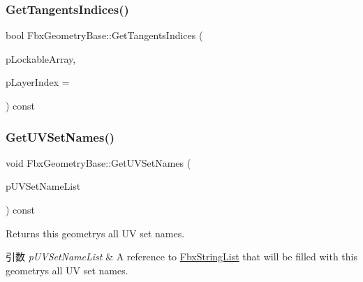 \mbox{\label{class_fbx_geometry_base_aa1da929bb1905386e98d8e1caff3556e}} 
\subsubsection{\texorpdfstring{Get\+Tangents\+Indices()}{GetTangentsIndices()}}
{\footnotesize\ttfamily bool Fbx\+Geometry\+Base\+::\+Get\+Tangents\+Indices (\begin{DoxyParamCaption}\item[{\hyperlink{class_fbx_layer_element_array_template}{Fbx\+Layer\+Element\+Array\+Template}$<$ int $>$ $\ast$$\ast$}]{p\+Lockable\+Array,  }\item[{const int}]{p\+Layer\+Index = {} }\end{DoxyParamCaption}) const}

\mbox{\label{class_fbx_geometry_base_a65147440e2f577ab7f5b60e228881641}} 
\subsubsection{\texorpdfstring{Get\+U\+V\+Set\+Names()}{GetUVSetNames()}}
{\footnotesize\ttfamily void Fbx\+Geometry\+Base\+::\+Get\+U\+V\+Set\+Names (\begin{DoxyParamCaption}\item[{\hyperlink{class_fbx_string_list}{Fbx\+String\+List} \&}]{p\+U\+V\+Set\+Name\+List }\end{DoxyParamCaption}) const}

Returns this geometry\textquotesingle{}s all UV set names. 
\begin{DoxyParams}{引数}
{\em p\+U\+V\+Set\+Name\+List} & A reference to {\ttfamily \hyperlink{class_fbx_string_list}{Fbx\+String\+List}} that will be filled with this geometry\textquotesingle{}s all UV set names. \\
\hline
\end{DoxyParams}
\mbox{\label{class_fbx_geometry_base_abc912331f01b903dee155a1a3dbff0b8}} 
